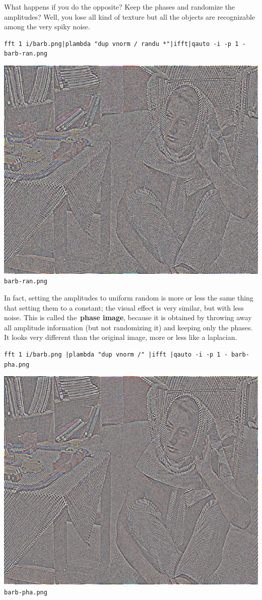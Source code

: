 What happens if you do the opposite?  Keep the phases and randomize the
amplitudes?  Well, you lose all kind of texture but all the objects are
recognizable among the very spiky noise.

\begin{verbatim}
fft 1 i/barb.png|plambda "dup vnorm / randu *"|ifft|qauto -i -p 1 - barb-ran.png
\end{verbatim}
\includegraphics{barb-ran.png}\verb+barb-ran.png+


In fact, setting the amplitudes to uniform random is more or less the same
thing that setting them to a constant; the visual effect is very similar, but
with less noise.  This is called the~{\bf phase image}, because it is
obtained by throwing away all amplitude information (but not randomizing it)
and keeping only the phases.  It looks very different than the original
image, more or less like a laplacian.

\begin{verbatim}
fft 1 i/barb.png |plambda "dup vnorm /" |ifft |qauto -i -p 1 - barb-pha.png
\end{verbatim}
\includegraphics{barb-pha.png}\verb_barb-pha.png_



